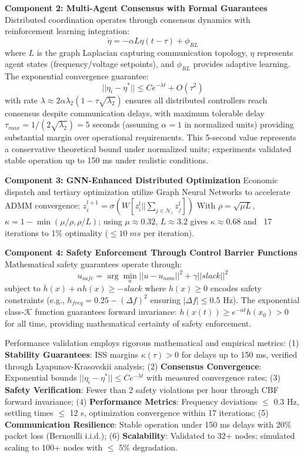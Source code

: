 \documentclass[12pt]{article}
\begin{document}
\textbf{Component 2: Multi-Agent Consensus with Formal Guarantees}
Distributed coordination operates through consensus dynamics with reinforcement learning integration:
$$\dot{\eta} = -\alpha L \eta(t-\tau) + \phi_{RL}$$
where $L$ is the graph Laplacian capturing communication topology, $\eta$ represents agent states (frequency/voltage setpoints), and $\phi_{RL}$ provides adaptive learning. The exponential convergence guarantee:
$$||\eta_i - \eta^*|| \leq Ce^{-\lambda t} + O(\tau^2)$$
with rate $\lambda \approx 2\alpha\lambda_2(1 - \tau\sqrt{\lambda_2})$ ensures all distributed controllers reach consensus despite communication delays, with maximum tolerable delay $\tau_{max} = 1/(2\sqrt{\lambda_2}) = 5$ seconds (assuming $\alpha = 1$ in normalized units) providing substantial margin over operational requirements. This 5-second value represents a conservative theoretical bound under normalized units; experiments validated stable operation up to 150 ms under realistic conditions.

\textbf{Component 3: GNN-Enhanced Distributed Optimization}
Economic dispatch and tertiary optimization utilize Graph Neural Networks to accelerate ADMM convergence:
$z_i^{l+1} = \sigma(W[z_i^l || \sum_{j \in \mathcal{N}_i} z_j^l])$
With $\rho = \sqrt{\mu L}$, $\kappa = 1 - \min(\mu/\rho, \rho/L)$; using $\mu \approx 0.32$, $L \approx 3.2$ gives $\kappa \approx 0.68$ and ~17 iterations to 1\% optimality ($\leq 10\;ms$ per iteration).

\textbf{Component 4: Safety Enforcement Through Control Barrier Functions}
Mathematical safety guarantees operate through:
$$u_{safe} = \arg\min_u ||u - u_{nom}||^2 + \gamma||slack||^2$$
subject to $\dot{h}(x) + \alpha h(x) \geq -slack$
where $h(x) \geq 0$ encodes safety constraints (e.g., $h_{freq} = 0.25 - (\Delta f)^2$ ensuring $|\Delta f| \leq 0.5$ Hz). The exponential class-$\mathcal{K}$ function guarantees forward invariance: $h(x(t)) \geq e^{-\alpha t}h(x_0) > 0$ for all time, providing mathematical certainty of safety enforcement.

Performance validation employs rigorous mathematical and empirical metrics: (1) \textbf{Stability Guarantees}: ISS margins $\kappa(\tau) > 0$ for delays up to 150 ms, verified through Lyapunov-Krasovskii analysis; (2) \textbf{Consensus Convergence}: Exponential bounds $||\eta_i - \eta^*|| \leq Ce^{-\lambda t}$ with measured convergence rates; (3) \textbf{Safety Verification}: Fewer than 2 safety violations per hour through CBF forward invariance; (4) \textbf{Performance Metrics}: Frequency deviations $\leq$ 0.3 Hz, settling times $\leq$ 12 s, optimization convergence within 17 iterations; (5) \textbf{Communication Resilience}: Stable operation under 150 ms delays with 20\% packet loss (Bernoulli i.i.d.); (6) \textbf{Scalability}: Validated to 32+ nodes; simulated scaling to 100+ nodes with $\leq$ 5\% degradation.
\end{document}
